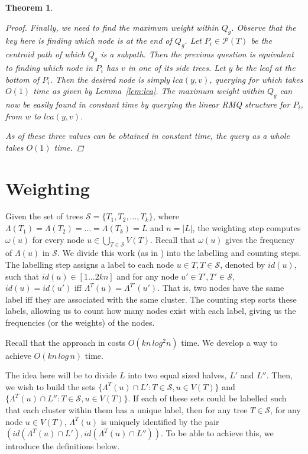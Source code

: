 \documentclass{article}
\newcommand{\leafset}{\Lambda}
\newcommand{\weight}{\omega}
\newtheorem{rmqquery}[incompatibility]{Theorem}
\begin{document}
\begin{rmqquery}
\begin{proof}
            Finally, we need to find the maximum weight within $Q_g$. Observe that the key here is finding which node is at the end of $Q_g$. Let $P_i \in \mathcal{P}(T)$ be the centroid path of which $Q_g$ is a subpath. Then the previous question is equivalent to finding which node in $P_i$ has $v$ in one of its side trees. Let $y$ be the leaf at the bottom of $P_i$. Then the desired node is simply $lca(y, v)$, querying for which takes $O(1)$ time as given by Lemma~\ref{lem:lca}. The maximum weight within $Q_g$ can now be easily found in constant time by querying the linear RMQ structure for $P_i$, from $w$ to $lca(y, v)$.

            As of these three values can be obtained in constant time, the query as a whole takes $O(1)$ time.
        \end{proof}
    \end{rmqquery}

    \section{Weighting}
    \label{sec:weighting}

    Given the set of trees $\mathcal{S} = \{T_1, T_2, ..., T_k\}$, where $\leafset(T_1) = \leafset(T_2) = ... = \leafset(T_k) = L$ and $n = |L|$, the weighting step computes $\weight(u)$ for every node $u \in \bigcup_{T \in \mathcal{S}}V(T)$. Recall that $\weight(u)$ gives the frequency of $\leafset(u)$ in $\mathcal{S}$. We divide this work (as in \cite{gawrychowski2017faster}) into the labelling and counting steps. The labelling step assigns a label to each node $u \in T, T \in \mathcal{S}$, denoted by $id(u)$, such that $id(u) \in [1 ... 2kn]$ and for any node $u' \in T', T' \in \mathcal{S}$, $id(u) = id(u')$ iff $\leafset^T(u) = \leafset^{T'}(u')$. That is, two nodes have the same label iff they are associated with the same cluster. The counting step sorts these labels, allowing us to count how many nodes exist with each label, giving us the frequencies (or the weights) of the nodes.

    Recall that the approach in \cite{gawrychowski2017faster} costs $O(kn\,log^2n)$ time. We develop a way to achieve $O(kn\,log\,n)$ time.

    The idea here will be to divide $L$ into two equal sized halves, $L'$ and $L''$. Then, we wish to build the sets $\{\leafset^T(u) \cap L' : T \in \mathcal{S}, u \in V(T)\}$ and $\{\leafset^T(u) \cap L'' : T \in \mathcal{S}, u \in V(T)\}$. If each of these sets could be labelled such that each cluster within them has a unique label, then for any tree $T \in \mathcal{S}$, for any node $u \in V(T)$, $\leafset^T(u)$ is uniquely identified by the pair $(id(\leafset^T(u) \cap L'), id(\leafset^T(u) \cap L''))$. To be able to achieve this, we introduce the definitions below.
\end{document}
